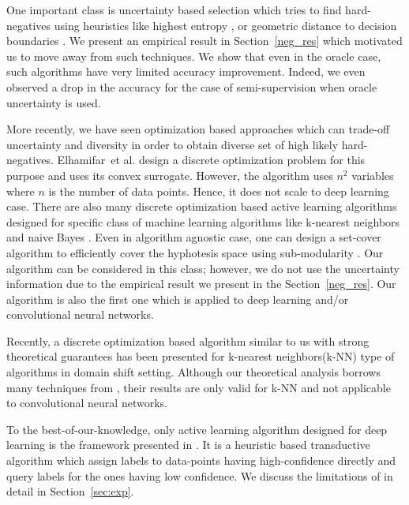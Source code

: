 \documentclass{article}
\begin{document}
One important class is uncertainty based selection \cite{tong2001support,lewissequential,joshi2009multi,li2013adaptive} which tries to find hard-negatives using heuristics like highest entropy \cite{joshi2009multi}, or geometric distance to decision boundaries \cite{tong2001support,brinker2003incorporating}. We present an empirical result in Section~\ref{neg_res} which motivated us to move away from such techniques. We show that even in the oracle case, such algorithms have very limited accuracy improvement. Indeed, we even observed a drop in the accuracy for the case of semi-supervision when oracle uncertainty is used. 

More recently, we have seen optimization based approaches which can trade-off uncertainty and diversity in order to obtain diverse set of high likely hard-negatives. Elhamifar~et al.  \cite{elhamifar2013convex} design a discrete optimization problem for this purpose and uses its convex surrogate. However, the algorithm uses $n^2$ variables where $n$ is the number of data points. Hence, it does not scale to deep learning case. There are also many discrete optimization based active learning algorithms designed for specific class of machine learning algorithms like k-nearest neighbors and naive Bayes \cite{wei2015submodularity}. Even in algorithm agnostic case, one can design a set-cover algorithm to efficiently cover the hyphotesis space using sub-modularity \cite{guillory2010interactive, golovin2011adaptive}. Our algorithm can be considered in this class; however, we do not use the uncertainty information due to the empirical result we present in the Section~\ref{neg_res}. Our algorithm is also the first one which is applied to deep learning and/or convolutional neural networks.

Recently, a discrete optimization based algorithm \cite{BerlindU15} similar to us with strong theoretical guarantees has been presented for k-nearest neighbors(k-NN) type of algorithms in domain shift setting. Although our theoretical analysis borrows many techniques from \cite{BerlindU15}, their results are only valid for k-NN and not applicable to convolutional neural networks. 

To the best-of-our-knowledge, only active learning algorithm designed for deep learning is the framework presented in \cite{wang2016cost}. It is a heuristic based transductive algorithm which assign labels to data-points having high-confidence directly and query labels for the ones having low confidence. We discuss the limitations of \cite{wang2016cost} in detail in Section~\ref{sec:exp}.
\end{document}

